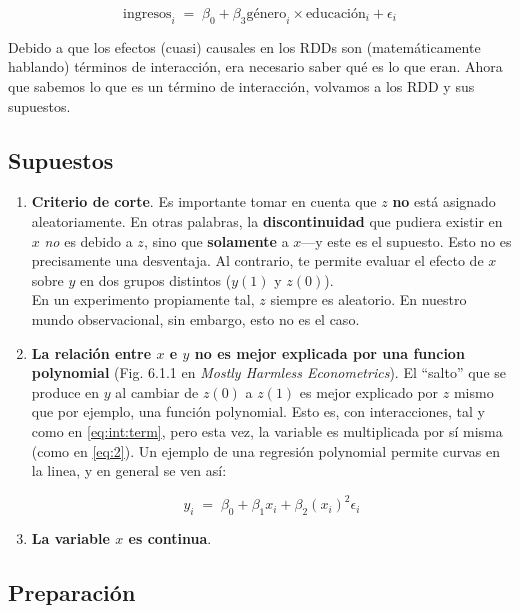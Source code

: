 \documentclass[10pt]{article}
\begin{document}
		\begin{equation}\label{eq:int:term:mala}
			\text{ingresos}_{i} \;=\; \beta_{0} + \beta_{3}{\text{g\'enero}}_{i}\times \text{educaci\'on}_{i} + \epsilon_{i}
		\end{equation}

Debido a que los efectos (cuasi) causales en los RDDs son (matem\'aticamente hablando) t\'erminos de interacci\'on, era necesario saber qu\'e es lo que eran. Ahora que sabemos lo que es un t\'ermino de interacci\'on, volvamos a los RDD y sus supuestos.

\subsection*{Supuestos}

\begin{enumerate}
	\item {\bf Criterio de corte}. Es importante tomar en cuenta que $z$ {\bf no} est\'a asignado aleatoriamente. En otras palabras, la {\bf discontinuidad} que pudiera existir en $x$ \emph{no} es debido a $z$, sino que {\bf solamente} a $x$---y este es el supuesto. Esto no es precisamente una desventaja. Al contrario, te permite evaluar el efecto de $x$ sobre $y$ en dos grupos distintos ($y(1)$ y $z(0)$). 
	\\
	En un experimento propiamente tal, $z$ siempre es aleatorio. En nuestro mundo observacional, sin embargo, esto no es el caso.

	\item {\bf La relaci\'on entre $x$ e $y$ no es mejor explicada por una funcion polynomial} (Fig. 6.1.1 en \emph{Mostly Harmless Econometrics}). El ``salto'' que se produce en $y$ al cambiar de $z(0)$ a $z(1)$ es mejor explicado por $z$ mismo que por ejemplo, una funci\'on polynomial. Esto es, con interacciones, tal y como en \autoref{eq:int:term}, pero esta vez, la variable es multiplicada por s\'i misma (como en \autoref{eq:2}). Un ejemplo de una regresi\'on polynomial permite curvas en la linea, y en general se ven as\'i:

		\begin{equation}\label{eq:2}
			y_{i} \;=\; \beta_{0} + \beta_{1}x_{i} + \beta_{2}(x_{i})^2 \epsilon_{i}
		\end{equation}

	\item {\bf La variable $x$ es continua}. 
\end{enumerate}

\subsection*{Preparaci\'on}
\end{document}
